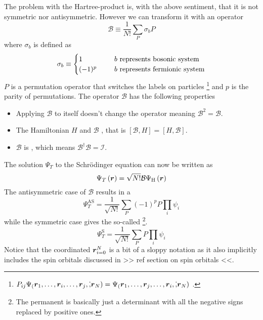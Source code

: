     The problem with the Hartree-product is, with the above sentiment, that it
    is not symmetric nor antisymmetric. However we can transform it with an
    operator
        \begin{equation}
            \mathcal{B} \equiv \frac{1}{N!}\sum_P\sigma_bP
        \end{equation}
    where $\sigma_b$ is defined as 
        \begin{equation}
            \sigma_b \equiv  
                \begin{cases}
                    1 \indent &\text{$b$ represents bosonic system} \\
                    (-1)^p \indent &\text{$b$ represents fermionic system}
                \end{cases}
        \end{equation}
    $P$ is a permutation operator that switches the labels on particles
    \footnote{$P_{ij}\Psi_(\boldsymbol{{r}}_1,\dots,\boldsymbol{{r}}_i,\dots,\boldsymbol{{r}}_j,\dot,\boldsymbol{{r}}_N)
    = \Psi_(\boldsymbol{{r}}_1,\dots,\boldsymbol{{r}}_j,\dots,\boldsymbol{{r}}_i,\dot,\boldsymbol{{r}}_N)$
    \cite{compphysThijssen}.} and $p$ is the parity of permutations. The
    operator $\mathcal{B}$ has the following properties
        \begin{itemize}
            \item Applying $\mathcal{B}$ to itself doesn't change the operator
                meaning $\mathcal{B}^2 = \mathcal{B}$.
            \item The Hamiltonian $H$ and $\mathcal{B}$ , that
                is $\left[\mathcal{B},H\right] = \left[H,\mathcal{B}\right]$.
            \item $\mathcal{B}$ is , which means
                $\mathcal{B}^{\dagger}\mathcal{B}=\mathcal{I}$.
        \end{itemize}
    The solution $\Psi_T$ to the Schrödinger equation can now be written as
        \begin{equation}
            \Psi_T\left(\boldsymbol{{r}}\right) =
            \sqrt{N!}\mathcal{B}\Psi_{\text{H}}\left(\boldsymbol{{r}}\right)
            \label{eq:psiOpB}
        \end{equation}
    The antisymmetric case of $\mathcal{B}$ results in a  
        \begin{equation}
            \Psi^{\text{AS}}_T = \frac{1}{\sqrt{N!}}\sum_{P}(-1)^pP\prod_i\psi_i
        \end{equation}
    while the symmetric case gives the so-called \footnote{The
    permanent is basically just a determinant with all the negative signs
    replaced by positive ones.}.
        \begin{equation}
            \Psi^{\text{S}}_T = \frac{1}{\sqrt{N!}}\sum_{P}P\prod_i\psi_i
        \end{equation}
    Notice that the coordinated ${\boldsymbol{{r}}}_{i=0}^{N}$ is a bit of a sloppy
    notation as it also implicitly includes the spin orbitals discussed in >>
    ref section on spin orbitals <<.

